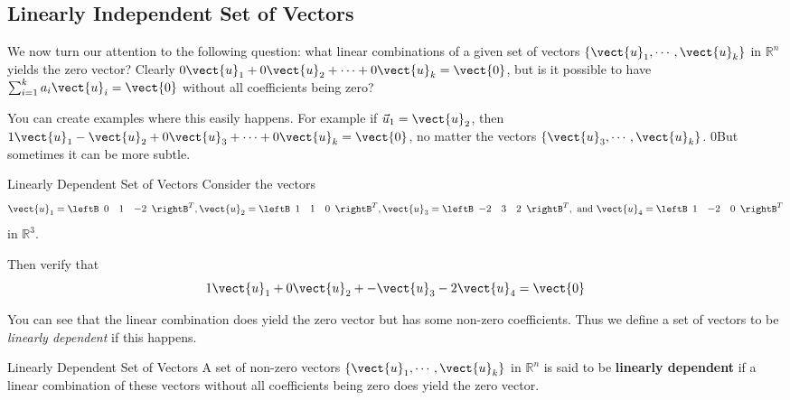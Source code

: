 \subsection{Linearly Independent Set of Vectors}

We now turn our attention to the following question: what linear
combinations of a given set of vectors $\{ \vect{u}_1, \cdots
,\vect{u}_k\}$ in $\mathbb{R}^{n}$ yields the zero vector? Clearly
$0\vect{u}_1 + 0\vect{u}_2+ \cdots + 0 \vect{u}_k = \vect{0}$, but is
it possible to have $\sum_{i=1}^{k}a_{i}\vect{u}_{i}=\vect{0}$ without
all coefficients being zero?

You can create examples where this easily happens. For example if $\vec{u}_1=\vect{u}_2$, then 
$1\vect{u}_1 - \vect{u}_2+ 0 \vect{u}_3 + \cdots  + 0 \vect{u}_k = \vect{0}$, no matter the vectors 
 $\{ \vect{u}_3, \cdots ,\vect{u}_k\}$. 0But sometimes it can be more subtle. 

\begin{example}{Linearly Dependent Set of Vectors}\label{exa:linearlydependentvectors}
Consider the vectors 
\begin{equation*}
\vect{u}_1=\leftB 
\begin{array}{rrr}
0  & 1 & -2
\end{array}
\rightB^T, 
\vect{u}_2=\leftB 
\begin{array}{rrr}
1  & 1 & 0
\end{array}
\rightB^T, 
\vect{u}_3=\leftB 
\begin{array}{rrr}
-2  & 3 & 2
\end{array}
\rightB^T, \mbox{ and } 
\vect{u}_4=\leftB 
\begin{array}{rrr}
1  & -2 & 0
\end{array}
\rightB^T
\end{equation*}
in $\mathbb{R}^{3}$.

Then verify that 
\begin{equation*}
1\vect{u}_1 +0 \vect{u}_2+ - \vect{u}_3 -2 \vect{u}_4 = \vect{0}
\end{equation*}
\end{example}

You can see that the linear combination does yield the zero vector but
has some non-zero coefficients. Thus we define a set of vectors to be
{\em linearly dependent} if this happens.

\begin{definition}{Linearly Dependent Set of Vectors}\label{def:lineardependent}
A set of non-zero vectors $\{ \vect{u}_1, \cdots ,\vect{u}_k\}$ in $\mathbb{R}^{n}$ is said to be 
\textbf{linearly dependent} if a linear combination of these vectors without all  coefficients being zero does yield the zero vector.
\end{definition}

